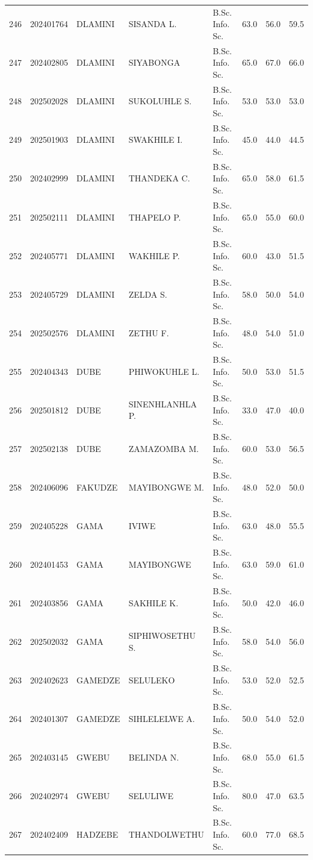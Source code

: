 \documentclass[12pt]{article}
\begin{document}
\begin{longtable}{@{}llllllll@{}}
246 & 202401764 & DLAMINI & SISANDA L. & B.Sc. Info. Sc. & 63.0 & 56.0 & 59.5 \\
247 & 202402805 & DLAMINI & SIYABONGA & B.Sc. Info. Sc. & 65.0 & 67.0 & 66.0 \\
248 & 202502028 & DLAMINI & SUKOLUHLE S. & B.Sc. Info. Sc. & 53.0 & 53.0 & 53.0 \\
249 & 202501903 & DLAMINI & SWAKHILE I. & B.Sc. Info. Sc. & 45.0 & 44.0 & 44.5 \\
250 & 202402999 & DLAMINI & THANDEKA C. & B.Sc. Info. Sc. & 65.0 & 58.0 & 61.5 \\
251 & 202502111 & DLAMINI & THAPELO P. & B.Sc. Info. Sc. & 65.0 & 55.0 & 60.0 \\
252 & 202405771 & DLAMINI & WAKHILE P. & B.Sc. Info. Sc. & 60.0 & 43.0 & 51.5 \\
253 & 202405729 & DLAMINI & ZELDA S. & B.Sc. Info. Sc. & 58.0 & 50.0 & 54.0 \\
254 & 202502576 & DLAMINI & ZETHU F. & B.Sc. Info. Sc. & 48.0 & 54.0 & 51.0 \\
255 & 202404343 & DUBE & PHIWOKUHLE L. & B.Sc. Info. Sc. & 50.0 & 53.0 & 51.5 \\
256 & 202501812 & DUBE & SINENHLANHLA P. & B.Sc. Info. Sc. & 33.0 & 47.0 & 40.0 \\
257 & 202502138 & DUBE & ZAMAZOMBA M. & B.Sc. Info. Sc. & 60.0 & 53.0 & 56.5 \\
258 & 202406096 & FAKUDZE & MAYIBONGWE M. & B.Sc. Info. Sc. & 48.0 & 52.0 & 50.0 \\
259 & 202405228 & GAMA & IVIWE & B.Sc. Info. Sc. & 63.0 & 48.0 & 55.5 \\
260 & 202401453 & GAMA & MAYIBONGWE & B.Sc. Info. Sc. & 63.0 & 59.0 & 61.0 \\
261 & 202403856 & GAMA & SAKHILE K. & B.Sc. Info. Sc. & 50.0 & 42.0 & 46.0 \\
262 & 202502032 & GAMA & SIPHIWOSETHU S. & B.Sc. Info. Sc. & 58.0 & 54.0 & 56.0 \\
263 & 202402623 & GAMEDZE & SELULEKO & B.Sc. Info. Sc. & 53.0 & 52.0 & 52.5 \\
264 & 202401307 & GAMEDZE & SIHLELELWE A. & B.Sc. Info. Sc. & 50.0 & 54.0 & 52.0 \\
265 & 202403145 & GWEBU & BELINDA N. & B.Sc. Info. Sc. & 68.0 & 55.0 & 61.5 \\
266 & 202402974 & GWEBU & SELULIWE & B.Sc. Info. Sc. & 80.0 & 47.0 & 63.5 \\
267 & 202402409 & HADZEBE & THANDOLWETHU & B.Sc. Info. Sc. & 60.0 & 77.0 & 68.5 \\

\end{longtable}
\end{document}
